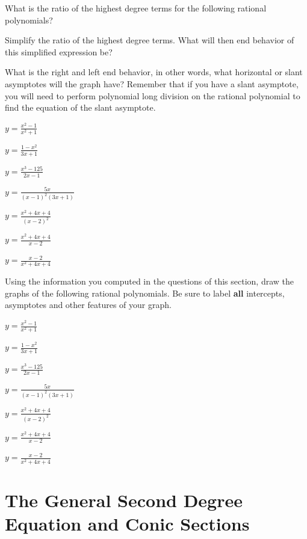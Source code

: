 \eq

\bq \be
\item What is the ratio of the highest degree terms for the following rational polynomials?
\item Simplify the ratio of the highest degree terms. What will then end behavior of this simplified expression be?
\item What is the right and left end behavior, in other words, what horizontal or slant asymptotes will the graph have? Remember that if you have a slant asymptote, you will need to perform polynomial long division on the rational polynomial to find the equation of the slant asymptote.
\ee
\be
\item $y=\frac{x^2-1}{x^2+1}$
\item $y=\frac{1-x^2}{3x+1}$
\item $y=\frac{x^3-125}{2x-1}$
\item $y=\frac{5x}{(x-1)^2(3x+1)}$
\item $y=\frac{x^2+4x+4}{(x-2)^2}$
\item $y=\frac{x^2+4x+4}{x-2}$
\item $y=\frac{x-2}{x^2+4x+4}$
\ee
\eq

\bq Using the information you computed in the questions of this section, draw the graphs of the following rational polynomials. Be sure to label \textbf{all} intercepts, asymptotes and other features of your graph.
\be
\item $y=\frac{x^2-1}{x^2+1}$
\item $y=\frac{1-x^2}{3x+1}$
\item $y=\frac{x^3-125}{2x-1}$
\item $y=\frac{5x}{(x-1)^2(3x+1)}$
\item $y=\frac{x^2+4x+4}{(x-2)^2}$
\item $y=\frac{x^2+4x+4}{x-2}$
\item $y=\frac{x-2}{x^2+4x+4}$
\ee
\eq
\newpage

\chapter{The General Second Degree Equation and Conic Sections}


